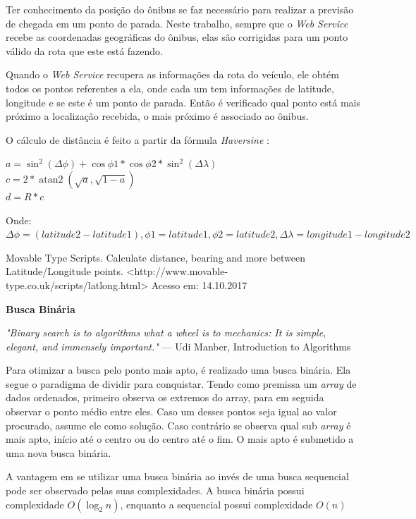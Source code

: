 \documentclass[
	12pt,				%
	oneside,			%
	a4paper,			%
	brazil				%
]{abntex2}
\DeclareMathOperator{\atantwo}{atan2}
\begin{document}
{Ter conhecimento da posição do ônibus se faz necessário para realizar a previsão de chegada em um ponto de parada. Neste trabalho, sempre que o \textit{Web Service} recebe as coordenadas geográficas do ônibus, elas são corrigidas para um ponto válido da rota que este está fazendo.

Quando o \textit{Web Service} recupera as informações da rota do veículo, ele obtém todos os pontos referentes a ela, onde cada um tem informações de latitude, longitude e se este é um ponto de parada. Então é verificado qual ponto está mais próximo a localização recebida, o mais próximo é associado ao ônibus.

O cálculo de distância é feito a partir da fórmula \textit{Haversine} :

\begin{center}

$ a = \sin^2(\Delta\phi) + \cos\phi1 * \cos\phi2 * \sin^2(\Delta\lambda) $  \\
$ c = 2 * \atantwo(\sqrt{a},\sqrt{1 - a}) $ \\
$ d = R * c $ 

\end{center}

Onde: $ \Delta\phi = (latitude2 - latitude1), \phi1 = latitude1, \phi2 = latitude2, \Delta\lambda = longitude1 - longitude2 $ 

Movable Type Scripts. Calculate distance, bearing and more between Latitude/Longitude points. <http://www.movable-type.co.uk/scripts/latlong.html> Acesso em: 14.10.2017

\textbf{Busca Binária}

\begin{flushright}
\textit{"Binary search is to algorithms
what a wheel is to mechanics:
It is simple, elegant, and immensely important."}
— Udi Manber, Introduction to Algorithms
\end{flushright}

Para otimizar a busca pelo ponto mais apto, é realizado uma busca binária. Ela segue o paradigma de dividir para conquistar. Tendo como premissa um \textit{array} de dados ordenados, primeiro observa os extremos do array, para em seguida observar o ponto médio entre eles. Caso um desses pontos seja igual ao valor procurado, assume ele como solução. Caso contrário se observa qual sub \textit{array} é mais apto, início até o centro ou do centro até o fim. O mais apto é submetido a uma nova busca binária. 

A vantagem em se utilizar uma busca binária ao invés de uma busca sequencial pode ser observado pelas suas complexidades. A busca binária possui complexidade $O(\log_2 n)$, enquanto a sequencial possui complexidade $O(n)$

}
\end{document}
